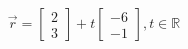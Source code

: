 \documentclass[preview]{standalone}
\begin{document}
\begin{align*}
\vec{r} =  \begin{bmatrix} 2 \\ 3 \end{bmatrix}  + t  \begin{bmatrix} -6 \\ -1 \end{bmatrix}  , t \in \mathbb{R}
\end{align*}
\end{document}
